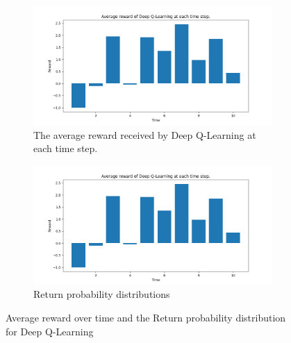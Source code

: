 \documentclass{class}
\begin{document}
\begin{appendices}
\begin{figure}
    \centering
    \begin{subfigure}[t]{0.47\linewidth}
        \centering
        \includegraphics[width=1\linewidth]{../plots/r_over_time/deep_q_learning_r_over_time.png}
        \caption{The average reward received by Deep Q-Learning at each time step.}
        \label{fig: dql over time}
    \end{subfigure}
    \begin{subfigure}[t]{0.47\linewidth}
        \centering
        \includegraphics[width=1\linewidth]{../plots/r_over_time/deep_q_learning_r_over_time.png}
        \caption{Return probability distributions}
        \label{fig: dql return probability}
    \end{subfigure}
    \caption{Average reward over time and the Return probability distribution for Deep Q-Learning}
    \label{fig: dqlstuff}
\end{figure}

\end{appendices}
\end{document}
